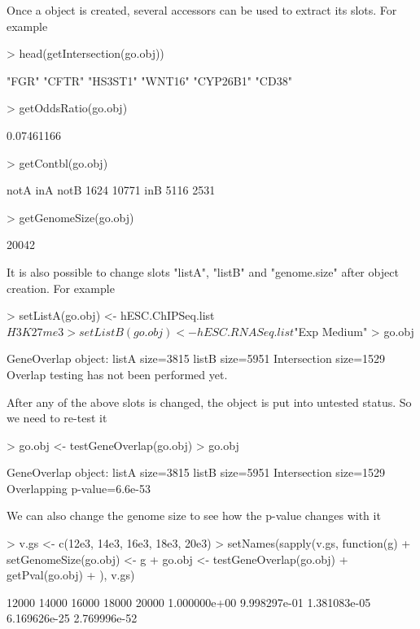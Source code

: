 \documentclass{article}
\begin{document}
Once a  object is created, several accessors can be used to extract its slots. For example
\begin{Schunk}
\begin{Sinput}
> head(getIntersection(go.obj))
\end{Sinput}
\begin{Soutput}
[1] "FGR"     "CFTR"    "HS3ST1"  "WNT16"   "CYP26B1" "CD38"   
\end{Soutput}
\begin{Sinput}
> getOddsRatio(go.obj)
\end{Sinput}
\begin{Soutput}
[1] 0.07461166
\end{Soutput}
\begin{Sinput}
> getContbl(go.obj)
\end{Sinput}
\begin{Soutput}
     notA   inA
notB 1624 10771
inB  5116  2531
\end{Soutput}
\begin{Sinput}
> getGenomeSize(go.obj)
\end{Sinput}
\begin{Soutput}
[1] 20042
\end{Soutput}
\end{Schunk}
It is also possible to change slots "listA", "listB" and "genome.size" after object creation. For example
\begin{Schunk}
\begin{Sinput}
> setListA(go.obj) <- hESC.ChIPSeq.list$H3K27me3
> setListB(go.obj) <- hESC.RNASeq.list$"Exp Medium"
> go.obj
\end{Sinput}
\begin{Soutput}
GeneOverlap object:
listA size=3815
listB size=5951
Intersection size=1529
Overlap testing has not been performed yet.
\end{Soutput}
\end{Schunk}
After any of the above slots is changed, the object is put into untested status. So we need to re-test it
\begin{Schunk}
\begin{Sinput}
> go.obj <- testGeneOverlap(go.obj)
> go.obj
\end{Sinput}
\begin{Soutput}
GeneOverlap object:
listA size=3815
listB size=5951
Intersection size=1529
Overlapping p-value=6.6e-53
\end{Soutput}
\end{Schunk}
We can also change the genome size to see how the p-value changes with it
\begin{Schunk}
\begin{Sinput}
> v.gs <- c(12e3, 14e3, 16e3, 18e3, 20e3)
> setNames(sapply(v.gs, function(g) {
+     setGenomeSize(go.obj) <- g
+     go.obj <- testGeneOverlap(go.obj)
+     getPval(go.obj)
+ }), v.gs)
\end{Sinput}
\begin{Soutput}
       12000        14000        16000        18000        20000 
1.000000e+00 9.998297e-01 1.381083e-05 6.169626e-25 2.769996e-52 
\end{Soutput}
\end{Schunk}
\end{document}
